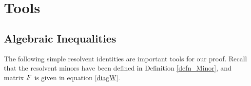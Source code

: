 \section{Tools}\label{app_tool}

\subsection{Algebraic Inequalities}


The following simple resolvent identities are important tools for our proof. Recall that the resolvent minors have been defined in Definition \ref{defn_Minor}, and matrix $F$ is given in equation \eqref{diagW}.
